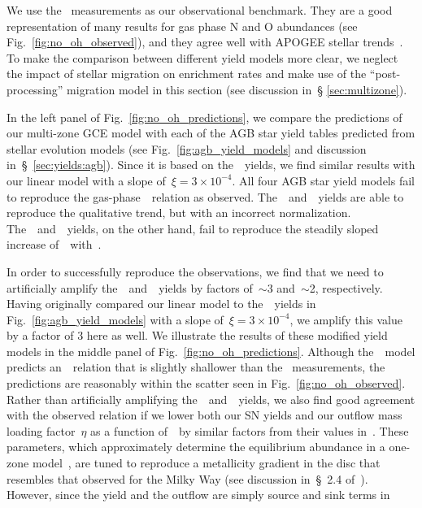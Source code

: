 \documentclass[ms.tex]{subfiles}
\begin{document}
We use the~\citet{Dopita2016} measurements as our observational benchmark.
They are a good representation of many results for gas phase N and O abundances
(see Fig.~\ref{fig:no_oh_observed}), and they agree well with APOGEE stellar
trends~\citep{Vincenzo2021}.
To make the comparison between different yield models more clear, we neglect
the impact of stellar migration on enrichment rates and make use of the
``post-processing'' migration model in this section (see discussion in~\S
\ref{sec:multizone}).
\par
In the left panel of Fig.~\ref{fig:no_oh_predictions}, we compare the
predictions of our multi-zone GCE model with each of the AGB star yield tables
predicted from stellar evolution models (see Fig.~\ref{fig:agb_yield_models}
and discussion in~\S~\ref{sec:yields:agb}).
Since it is based on the~\cristallo~yields, we find similar results with our
linear model with a slope of~$\xi = 3\times10^{-4}$.
All four AGB star yield models fail to reproduce the gas-phase~\ohno~relation
as observed.
The~\cristallo~and~\ventura~yields are able to reproduce the qualitative trend,
but with an incorrect normalization.
The~\karakasten~and~\karakas~yields, on the other hand, fail to reproduce
the steadily sloped increase of~\no~with~\oh.
\par
In order to successfully reproduce the observations, we find that we need to
artificially amplify the~\cristallo~and~\ventura~yields by factors of~$\sim$3
and~$\sim$2, respectively.
Having originally compared our linear model to the~\cristallo~yields in
Fig.~\ref{fig:agb_yield_models} with a slope of~$\xi = 3\times10^{-4}$, we
amplify this value by a factor of 3 here as well.
We illustrate the results of these modified yield models in the middle panel
of Fig.~\ref{fig:no_oh_predictions}.
Although the~\ventura~model predicts an~\ohno~relation that is slightly
shallower than the~\citet{Dopita2016} measurements, the predictions are
reasonably within the scatter seen in Fig.~\ref{fig:no_oh_observed}.
Rather than artificially amplifying the~\cristallo~and~\ventura~yields, we also
find good agreement with the observed relation if we lower both our SN yields
and our outflow mass loading factor~$\eta$ as a function of~\rgal~by similar
factors from their values in~\citet{Johnson2021}.
These parameters, which approximately determine the equilibrium abundance in a
one-zone model~\citep{Weinberg2017}, are tuned to reproduce a metallicity
gradient in the disc that resembles that observed for the Milky Way (see
discussion in~\S~2.4 of~\citealp{Johnson2021}).
However, since the yield and the outflow are simply source and sink terms in
\end{document}
